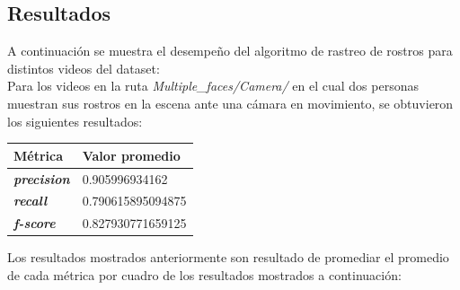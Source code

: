 \documentclass[a4paper,openright,12pt]{report}
\begin{document}
\subsection{Resultados}
A continuación se muestra el desempeño del algoritmo de rastreo de rostros para
distintos videos del dataset:\\

Para los videos en la ruta \textit{Multiple\_faces/Camera/}
en el cual dos personas muestran sus rostros en la escena ante una cámara en
movimiento, se obtuvieron los siguientes resultados:

\begin{center}
  \begin{longtable}{| p{} | p{} |}
  \hline
  \textbf{Métrica} &
  \textbf{Valor promedio}
  \\ \hline

  \textbf{\textit{precision}} &
  0.905996934162
  \\ \hline

  \textbf{\textit{recall}} &
  0.790615895094875
  \\ \hline

  \textbf{\textit{f-score}} &
  0.827930771659125
  \\ \hline
  \end{longtable}
\end{center}

Los resultados mostrados anteriormente son resultado de promediar el promedio de
cada métrica por cuadro de los resultados mostrados a continuación:
\end{document}
